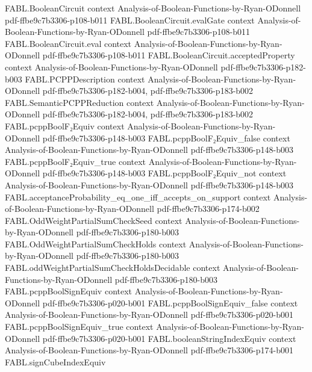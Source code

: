 \begin{theorem}
\proofstep
  {FABL.BooleanCircuit}
  {context}
  {Analysis-of-Boolean-Functions-by-Ryan-ODonnell}
  {pdf-ffbe9c7b3306-p108-b011}
\proofstep
  {FABL.BooleanCircuit.evalGate}
  {context}
  {Analysis-of-Boolean-Functions-by-Ryan-ODonnell}
  {pdf-ffbe9c7b3306-p108-b011}
\proofstep
  {FABL.BooleanCircuit.eval}
  {context}
  {Analysis-of-Boolean-Functions-by-Ryan-ODonnell}
  {pdf-ffbe9c7b3306-p108-b011}
\proofstep
  {FABL.BooleanCircuit.acceptedProperty}
  {context}
  {Analysis-of-Boolean-Functions-by-Ryan-ODonnell}
  {pdf-ffbe9c7b3306-p182-b003}
\proofstep
  {FABL.PCPPDescription}
  {context}
  {Analysis-of-Boolean-Functions-by-Ryan-ODonnell}
  {pdf-ffbe9c7b3306-p182-b004,
    pdf-ffbe9c7b3306-p183-b002}
\proofstep
  {FABL.SemanticPCPPReduction}
  {context}
  {Analysis-of-Boolean-Functions-by-Ryan-ODonnell}
  {pdf-ffbe9c7b3306-p182-b004,
    pdf-ffbe9c7b3306-p183-b002}
\proofstep
  {FABL.pcppBoolF₂Equiv}
  {context}
  {Analysis-of-Boolean-Functions-by-Ryan-ODonnell}
  {pdf-ffbe9c7b3306-p148-b003}
\proofstep
  {FABL.pcppBoolF₂Equiv_false}
  {context}
  {Analysis-of-Boolean-Functions-by-Ryan-ODonnell}
  {pdf-ffbe9c7b3306-p148-b003}
\proofstep
  {FABL.pcppBoolF₂Equiv_true}
  {context}
  {Analysis-of-Boolean-Functions-by-Ryan-ODonnell}
  {pdf-ffbe9c7b3306-p148-b003}
\proofstep
  {FABL.pcppBoolF₂Equiv_not}
  {context}
  {Analysis-of-Boolean-Functions-by-Ryan-ODonnell}
  {pdf-ffbe9c7b3306-p148-b003}
\proofstep
  {FABL.acceptanceProbability_eq_one_iff_accepts_on_support}
  {context}
  {Analysis-of-Boolean-Functions-by-Ryan-ODonnell}
  {pdf-ffbe9c7b3306-p174-b002}
\proofstep
  {FABL.OddWeightPartialSumCheckSeed}
  {context}
  {Analysis-of-Boolean-Functions-by-Ryan-ODonnell}
  {pdf-ffbe9c7b3306-p180-b003}
\proofstep
  {FABL.OddWeightPartialSumCheckHolds}
  {context}
  {Analysis-of-Boolean-Functions-by-Ryan-ODonnell}
  {pdf-ffbe9c7b3306-p180-b003}
\proofstep
  {FABL.oddWeightPartialSumCheckHoldsDecidable}
  {context}
  {Analysis-of-Boolean-Functions-by-Ryan-ODonnell}
  {pdf-ffbe9c7b3306-p180-b003}
\proofstep
  {FABL.pcppBoolSignEquiv}
  {context}
  {Analysis-of-Boolean-Functions-by-Ryan-ODonnell}
  {pdf-ffbe9c7b3306-p020-b001}
\proofstep
  {FABL.pcppBoolSignEquiv_false}
  {context}
  {Analysis-of-Boolean-Functions-by-Ryan-ODonnell}
  {pdf-ffbe9c7b3306-p020-b001}
\proofstep
  {FABL.pcppBoolSignEquiv_true}
  {context}
  {Analysis-of-Boolean-Functions-by-Ryan-ODonnell}
  {pdf-ffbe9c7b3306-p020-b001}
\proofstep
  {FABL.booleanStringIndexEquiv}
  {context}
  {Analysis-of-Boolean-Functions-by-Ryan-ODonnell}
  {pdf-ffbe9c7b3306-p174-b001}
\proofstep
  {FABL.signCubeIndexEquiv}

\end{theorem}
